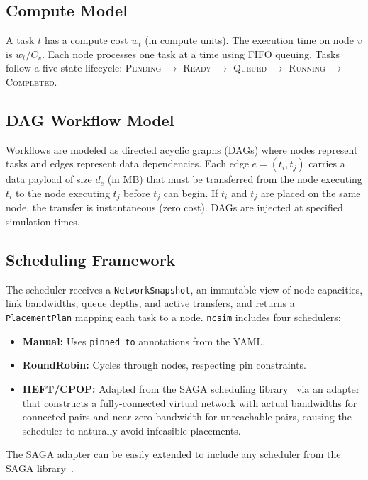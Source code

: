 \documentclass[conference]{IEEEtran}
\newcommand{\ncsim}{\texttt{ncsim}}
\begin{document}
\subsection{Compute Model}

A task $t$ has a compute cost $w_t$ (in compute units).  The execution time
on node $v$ is $w_t / C_v$.  Each node processes one task at a time using
FIFO queuing.  Tasks follow a five-state lifecycle: \textsc{Pending}
$\rightarrow$ \textsc{Ready} $\rightarrow$ \textsc{Queued} $\rightarrow$
\textsc{Running} $\rightarrow$ \textsc{Completed}.

\subsection{DAG Workflow Model}

Workflows are modeled as directed acyclic graphs (DAGs) where nodes represent
tasks and edges represent data dependencies.  Each edge $e = (t_i, t_j)$
carries a data payload of size $d_e$ (in MB) that must be transferred from
the node executing $t_i$ to the node executing $t_j$ before $t_j$ can begin.
If $t_i$ and $t_j$ are placed on the same node, the transfer is
instantaneous (zero cost).  DAGs are injected at specified simulation times.

\subsection{Scheduling Framework}

The scheduler receives a \texttt{NetworkSnapshot}, an immutable view of
node capacities, link bandwidths, queue depths, and active transfers, and
returns a \texttt{PlacementPlan} mapping each task to a node.  \ncsim{}
includes four schedulers:

\begin{itemize}[itemsep=1pt,leftmargin=*]
\item \textbf{Manual:} Uses \texttt{pinned\_to} annotations from the YAML.
\item \textbf{RoundRobin:} Cycles through nodes, respecting pin constraints.
\item \textbf{HEFT/CPOP:} Adapted from the SAGA scheduling library~\cite{heft}
  via an adapter that constructs a fully-connected virtual network with actual
  bandwidths for connected pairs and near-zero bandwidth for unreachable
  pairs, causing the scheduler to naturally avoid infeasible placements.
\end{itemize}
\noindent The SAGA adapter can be easily extended to include any scheduler
from the SAGA library~\cite{SAGARepo}.
\end{document}
